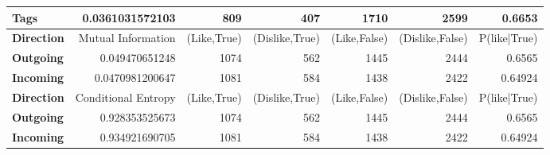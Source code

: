 \begin{table}
\begin{tabular}{| >{\small}l | >{\small}r | >{\small}r | >{\small}r | >{\small}r | >{\small}r | >{\small}r |}
		\hline
		\textbf{Tags}  &  0.0361031572103 & 809 & 407 & 1710 & 2599 & 0.6653\\
		\hline
		\hline
		\textbf{Direction} & Mutual Information & (Like,True) & (Dislike,True) & (Like,False) & (Dislike,False)  & P(like|True)\\
		\hline
		\textbf{Outgoing}  &  0.049470651248 & 1074 & 562 & 1445 & 2444 &  0.6565\\
		\hline
		\textbf{Incoming}  &  0.0470981200647 & 1081 & 584 & 1438 & 2422 & 0.64924\\
		\hline
		\hline
		\textbf{Direction} & Conditional Entropy &  (Like,True) & (Dislike,True) & (Like,False) & (Dislike,False)  & P(like|True)\\
		\hline
		\textbf{Outgoing}  &  0.928353525673 & 1074 & 562 & 1445 & 2444 & 0.6565\\
		\hline
		\textbf{Incoming}  &  0.934921690705 & 1081 & 584 & 1438 & 2422 & 0.64924\\
		\hline
	\end{tabular}
\end{table}
		

